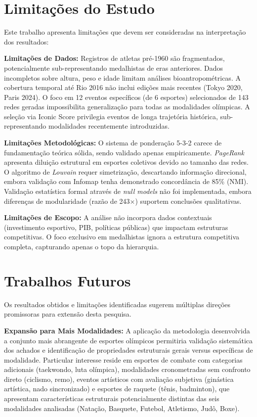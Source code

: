 \section{Limitações do Estudo}

Este trabalho apresenta limitações que devem ser consideradas na interpretação dos resultados:

\textbf{Limitações de Dados:} Registros de atletas pré-1960 são fragmentados, potencialmente sub-representando medalhistas de eras anteriores. Dados incompletos sobre altura, peso e idade limitam análises bioantropométricas. A cobertura temporal até Rio 2016 não inclui edições mais recentes (Tokyo 2020, Paris 2024). O foco em 12 eventos específicos (de 6 esportes) selecionados de 143 redes geradas impossibilita generalização para todas as modalidades olímpicas. A seleção via Iconic Score privilegia eventos de longa trajetória histórica, sub-representando modalidades recentemente introduzidas.

\textbf{Limitações Metodológicas:} O sistema de ponderação 5-3-2 carece de fundamentação teórica sólida, sendo validado apenas empiricamente. \textit{PageRank}{} apresenta diluição estrutural em esportes coletivos devido ao tamanho das redes. O algoritmo de \textit{Louvain}{} requer simetrização, descartando informação direcional, embora validação com Infomap tenha demonstrado concordância de 85\% (NMI). Validação estatística formal através de \textit{null models} não foi implementada, embora diferenças de modularidade (razão de 243×) suportem conclusões qualitativas.

\textbf{Limitações de Escopo:} A análise não incorpora dados contextuais (investimento esportivo, PIB, políticas públicas) que impactam estruturas competitivas. O foco exclusivo em medalhistas ignora a estrutura competitiva completa, capturando apenas o topo da hierarquia.

\section{Trabalhos Futuros}

Os resultados obtidos e limitações identificadas sugerem múltiplas direções promissoras para extensão desta pesquisa.

\textbf{Expansão para Mais Modalidades:} A aplicação da metodologia desenvolvida a conjunto mais abrangente de esportes olímpicos permitiria validação sistemática dos achados e identificação de propriedades estruturais gerais versus específicas de modalidade. Particular interesse reside em esportes de combate com categorias adicionais (taekwondo, luta olímpica), modalidades cronometradas sem confronto direto (ciclismo, remo), eventos artísticos com avaliação subjetiva (ginástica artística, nado sincronizado) e esportes de raquete (tênis, badminton), que apresentam características estruturais potencialmente distintas das seis modalidades analisadas (Natação, Basquete, Futebol, Atletismo, Judô, Boxe).

